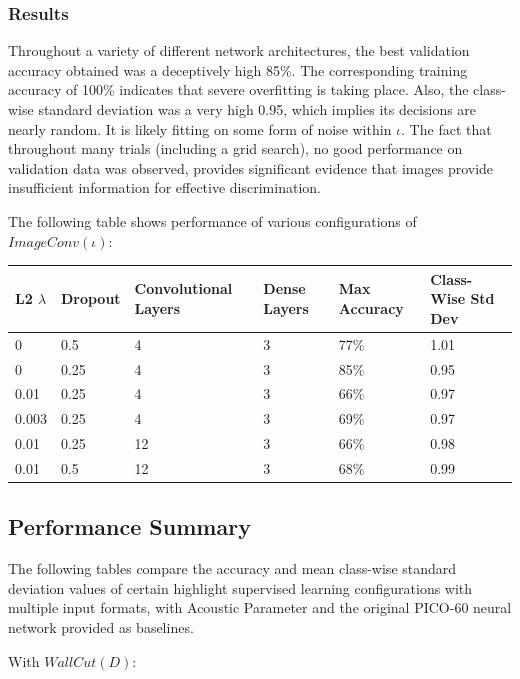 \documentclass[10pt]{article}
\begin{document}
\subsubsection{Results}

Throughout a variety of different network architectures, the best validation accuracy obtained was a deceptively high 85\%. The corresponding training accuracy of 100\% indicates that severe overfitting is taking place. Also, the class-wise standard deviation was a very high 0.95, which implies its decisions are nearly random. It is likely fitting on some form of noise within $\iota$. The fact that throughout many trials (including a grid search), no good performance on validation data was observed, provides significant evidence that images provide insufficient information for effective discrimination.

The following table shows performance of various configurations of $ImageConv(\iota)$:

\begin{tabular}{|l|l|l|l|l|l|}
    \hline
    L2 $\lambda$ & Dropout & Convolutional Layers & Dense Layers & Max Accuracy & Class-Wise Std Dev \\
    \hline
    0 & 0.5 & 4 & 3 & 77\% & 1.01 \\
    \hline
    0 & 0.25 & 4 & 3 & 85\% & 0.95 \\
    \hline
    0.01 & 0.25 & 4 & 3 & 66\% & 0.97 \\
    \hline
    0.003 & 0.25 & 4 & 3 & 69\% & 0.97 \\
    \hline
    0.01 & 0.25 & 12 & 3 & 66\% & 0.98 \\
    \hline
    0.01 & 0.5 & 12 & 3 & 68\% & 0.99 \\
    \hline
\end{tabular}

\subsection{Performance Summary}

The following tables compare the accuracy and mean class-wise standard deviation values of certain highlight supervised learning configurations with multiple input formats, with Acoustic Parameter and the original PICO-60 neural network provided as baselines.

With $WallCut(D)$:
\end{document}
